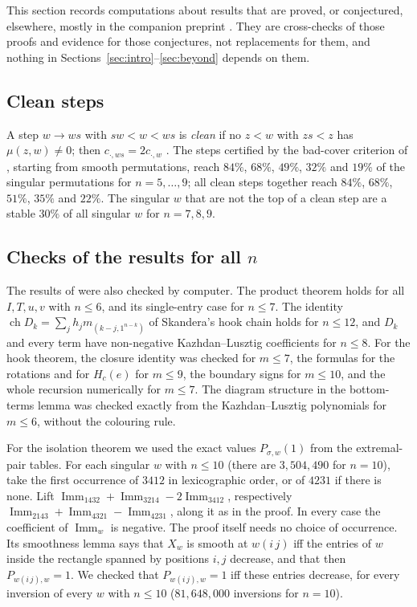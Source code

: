 \documentclass[11pt]{amsart}
\theoremstyle{definition}
\theoremstyle{remark}
\newcommand{\Imm}{\operatorname{Imm}}
\DeclareMathOperator{\ch}{ch}
\begin{document}
This section records computations about results that are proved, or conjectured, elsewhere, mostly in the companion preprint \cite{McN}. They are cross-checks of those proofs and evidence for those conjectures, not replacements for them, and nothing in Sections~\ref{sec:intro}--\ref{sec:beyond} depends on them.

\subsection{Clean steps}
A step $w\to ws$ with $sw<w<ws$ is \emph{clean} if no $z<w$ with $zs<z$ has $\mu(z,w)\ne0$; then $c_{\cdot,ws}=2c_{\cdot,w}$ \cite[\S7.2]{McN}. The steps certified by the bad-cover criterion of \cite[Prop.~7.8]{McN}, starting from smooth permutations, reach $84\%$, $68\%$, $49\%$, $32\%$ and $19\%$ of the singular permutations for $n=5,\dots,9$; all clean steps together reach $84\%$, $68\%$, $51\%$, $35\%$ and $22\%$. The singular $w$ that are not the top of a clean step are a stable $30\%$ of all singular $w$ for $n=7,8,9$.

\subsection{Checks of the results for all $n$}
The results of \cite{McN} were also checked by computer. The product theorem \cite[Thm.~3.1]{McN} holds for all $I,T,u,v$ with $n\le6$, and its single-entry case for $n\le7$. The identity $\ch D_k=\sum_jh_jm_{(k-j,1^{n-k})}$ of Skandera's hook chain holds for $n\le12$, and $D_k$ and every term have non-negative Kazhdan--Lusztig coefficients for $n\le8$. For the hook theorem, the closure identity was checked for $m\le7$, the formulas for the rotations and for $H_c(e)$ for $m\le9$, the boundary signs for $m\le10$, and the whole recursion numerically for $m\le7$. The diagram structure in the bottom-terms lemma was checked exactly from the Kazhdan--Lusztig polynomials for $m\le6$, without the colouring rule.

For the isolation theorem \cite[Thm.~9.6]{McN} we used the exact values $P_{\sigma,w}(1)$ from the extremal-pair tables. For each singular $w$ with $n\le10$ (there are $3{,}504{,}490$ for $n=10$), take the first occurrence of $3412$ in lexicographic order, or of $4231$ if there is none. Lift $\Imm_{1432}+\Imm_{3214}-2\Imm_{3412}$, respectively $\Imm_{2143}+\Imm_{4321}-\Imm_{4231}$, along it as in the proof. In every case the coefficient of $\Imm_w$ is negative. The proof itself needs no choice of occurrence. Its smoothness lemma \cite[Lemma~9.5]{McN} says that $X_w$ is smooth at $w(i\,j)$ iff the entries of $w$ inside the rectangle spanned by positions $i,j$ decrease, and that then $P_{w(i\,j),w}=1$. We checked that $P_{w(i\,j),w}=1$ iff these entries decrease, for every inversion of every $w$ with $n\le10$ ($81{,}648{,}000$ inversions for $n=10$).
\end{document}
